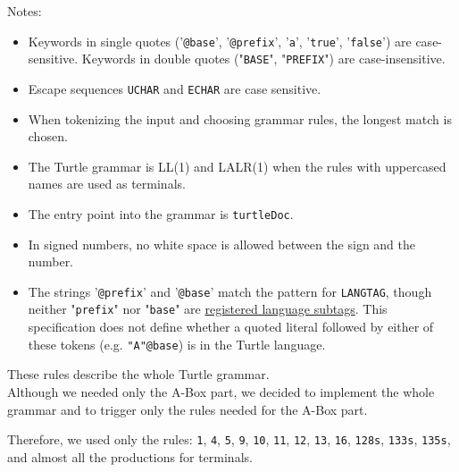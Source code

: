 \documentclass[oneside]{book}
\begin{document}
Notes:
\begin{itemize}
	\item [] Keywords in single quotes ('\texttt{@base}', '\texttt{@prefix}', '\texttt{a}', '\texttt{true}', '\texttt{false}') are case-sensitive. Keywords in double quotes ("\texttt{BASE}", "\texttt{PREFIX}") are case-insensitive. 
	\item [] Escape sequences \texttt{UCHAR} and \texttt{ECHAR} are case sensitive. 
	\item [] When tokenizing the input and choosing grammar rules, the longest match is chosen. 
	\item [] The Turtle grammar is LL(1) and LALR(1) when the rules with uppercased names are used as terminals. 
	\item [] The entry point into the grammar is \texttt{turtleDoc}. 
	\item [] In signed numbers, no white space is allowed between the sign and the number. 
	\item [] The strings '\texttt{@prefix}' and '\texttt{@base}' match the pattern for \texttt{LANGTAG}, though neither "\texttt{prefix}" nor "\texttt{base}" are \href{http://www.iana.org/assignments/language-subtag-registry}{registered language subtags}. This specification does not define whether a quoted literal followed by either of these tokens (e.g. \texttt{"A"@base}) is in the Turtle language. 
\end{itemize}

These rules describe the whole Turtle grammar.\\
Although we needed only the A-Box part, we decided to implement the whole grammar and to trigger only the rules needed for the A-Box part.

Therefore, we used only the rules: \texttt{1}, \texttt{4}, \texttt{5}, \texttt{9}, \texttt{10}, \texttt{11}, \texttt{12}, \texttt{13}, \texttt{16}, \texttt{128s}, \texttt{133s}, \texttt{135s}, and almost all the productions for terminals.
\end{document}
